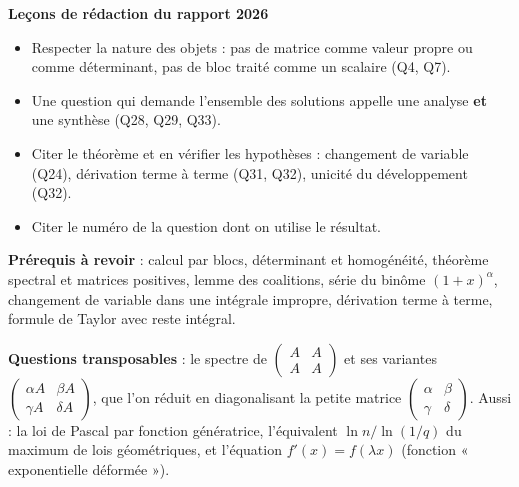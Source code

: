 \documentclass[11pt,a4paper]{article}
\providecommand{\tightlist}{\setlength{\itemsep}{0pt}\setlength{\parskip}{0pt}}
\begin{document}
\textbf{Leçons de rédaction du rapport 2026}

\begin{itemize}
\tightlist
\item
  Respecter la nature des objets : pas de matrice comme valeur propre ou comme déterminant, pas de bloc traité comme un scalaire (Q4, Q7).
\item
  Une question qui demande l'ensemble des solutions appelle une analyse \textbf{et} une synthèse (Q28, Q29, Q33).
\item
  Citer le théorème et en vérifier les hypothèses : changement de variable (Q24), dérivation terme à terme (Q31, Q32), unicité du développement (Q32).
\item
  Citer le numéro de la question dont on utilise le résultat.
\end{itemize}

\textbf{Prérequis à revoir} : calcul par blocs, déterminant et homogénéité, théorème spectral et matrices positives, lemme des coalitions, série du binôme \((1+x)^\alpha\), changement de variable dans une intégrale impropre, dérivation terme à terme, formule de Taylor avec reste intégral.

\textbf{Questions transposables} : le spectre de \(\begin{pmatrix}A&A\\A&A\end{pmatrix}\) et ses variantes \(\begin{pmatrix}\alpha A&\beta A\\\gamma A&\delta A\end{pmatrix}\), que l'on réduit en diagonalisant la petite matrice \(\begin{pmatrix}\alpha&\beta\\\gamma&\delta\end{pmatrix}\). Aussi : la loi de Pascal par fonction génératrice, l'équivalent \(\ln n/\ln(1/q)\) du maximum de lois géométriques, et l'équation \(f'(x)=f(\lambda x)\) (fonction « exponentielle déformée »).
\end{document}
